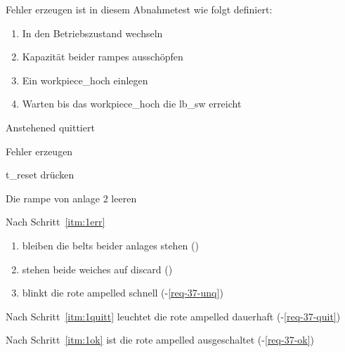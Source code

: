 \label{abntest-fehlerumgang}

\begin{anmerkungen}
    \item Fehler erzeugen ist in diesem Abnahmetest wie folgt definiert:
    \begin{enumerate}
        \item In den Betriebszustand wechseln
        \item Kapazität beider \glspl{rampe} ausschöpfen
        \item Ein \gls{workpiece_hoch} einlegen
        \item Warten bis das \gls{workpiece_hoch} die \gls{lb_sw} erreicht
    \end{enumerate}
\end{anmerkungen}

\begin{ablauf}{Anstehened quittiert}
    \item \label{itm:1err} Fehler erzeugen
    \item\label{itm:1quitt} \gls{t_reset} drücken
    \item\label{itm:1ok} Die \gls{rampe} von \gls{anlage} 2 leeren
\end{ablauf}
\begin{erwartung}
    \item Nach Schritt~\ref{itm:1err}
    \begin{enumerate}
        \item bleiben die \glspl{belt} beider \glspl{anlage} stehen ()
        \item stehen beide \glspl{weiche} auf \gls{discard} ()
        \item blinkt die rote \gls{ampelled} schnell (-\ref{req-37-unq})
    \end{enumerate}
    \item Nach Schritt~\ref{itm:1quitt} leuchtet die rote \gls{ampelled} dauerhaft (-\ref{req-37-quit})
    \item Nach Schritt~\ref{itm:1ok} ist die rote \gls{ampelled} ausgeschaltet (-\ref{req-37-ok})
\end{erwartung}

